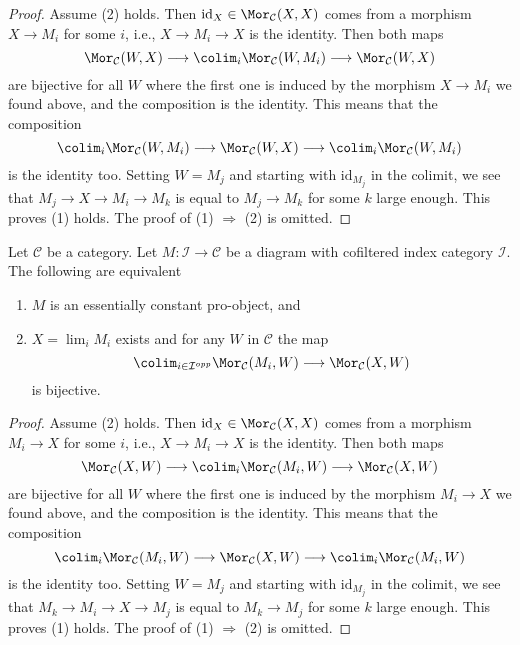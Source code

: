 \begin{proof}
Assume (2) holds. Then $\text{id}_X \in \Mor_\mathcal{C}(X, X)$
comes from a morphism $X \to M_i$ for some $i$, i.e., $X \to M_i \to X$
is the identity. Then both maps
$$
\Mor_\mathcal{C}(W, X)
\longrightarrow
\colim_i \Mor_\mathcal{C}(W, M_i)
\longrightarrow
\Mor_\mathcal{C}(W, X)
$$
are bijective for all $W$ where the first one is induced by the morphism
$X \to M_i$ we found above, and the composition is the identity. This means
that the composition
$$
\colim_i \Mor_\mathcal{C}(W, M_i)
\longrightarrow
\Mor_\mathcal{C}(W, X)
\longrightarrow
\colim_i \Mor_\mathcal{C}(W, M_i)
$$
is the identity too. Setting $W = M_j$ and starting with $\text{id}_{M_j}$
in the colimit, we see that $M_j \to X \to M_i \to M_k$ is equal to
$M_j \to M_k$ for some $k$ large enough. This proves (1) holds.
The proof of (1) $\Rightarrow$ (2) is omitted.
\end{proof}

\begin{lemma}
\label{lemma-characterize-essentially-constant-pro}
Let $\mathcal{C}$ be a category. Let $M : \mathcal{I} \to \mathcal{C}$
be a diagram with cofiltered index category $\mathcal{I}$.
The following are equivalent
\begin{enumerate}
\item $M$ is an essentially constant pro-object, and
\item $X = \lim_i M_i$ exists and for any $W$ in $\mathcal{C}$
the map
$$
\colim_{i \in \mathcal{I}^{opp}} \Mor_\mathcal{C}(M_i, W)
\longrightarrow
\Mor_\mathcal{C}(X, W)
$$
is bijective.
\end{enumerate}
\end{lemma}

\begin{proof}
Assume (2) holds. Then $\text{id}_X \in \Mor_\mathcal{C}(X, X)$
comes from a morphism $M_i \to X$ for some $i$, i.e., $X \to M_i \to X$
is the identity. Then both maps
$$
\Mor_\mathcal{C}(X, W)
\longrightarrow
\colim_i \Mor_\mathcal{C}(M_i, W)
\longrightarrow
\Mor_\mathcal{C}(X, W)
$$
are bijective for all $W$ where the first one is induced by the morphism
$M_i \to X$ we found above, and the composition is the identity. This means
that the composition
$$
\colim_i \Mor_\mathcal{C}(M_i, W)
\longrightarrow
\Mor_\mathcal{C}(X, W)
\longrightarrow
\colim_i \Mor_\mathcal{C}(M_i, W)
$$
is the identity too. Setting $W = M_j$ and starting with $\text{id}_{M_j}$
in the colimit, we see that $M_k \to M_i \to X \to M_j$ is equal to
$M_k \to M_j$ for some $k$ large enough. This proves (1) holds.
The proof of (1) $\Rightarrow$ (2) is omitted.
\end{proof}

